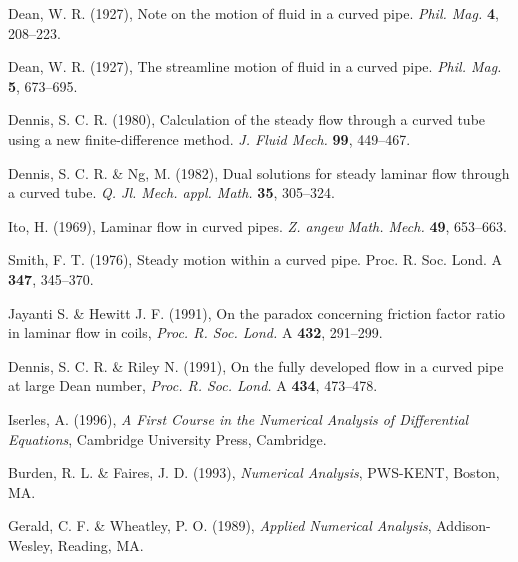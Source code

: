 \documentclass[10pt,a4paper]{report}
\begin{document}
\begin{thebibliography}{99}

Dean, W. R. (1927), Note on the motion of fluid in a curved pipe. \textit{Phil. Mag.} \textbf{4}, 208--223.

Dean, W. R. (1927), The streamline motion of fluid in a curved pipe. \textit{Phil. Mag.} \textbf{5}, 673--695.

Dennis, S. C. R. (1980), Calculation of the steady flow through a curved tube using a new finite-difference method. \textit{J. Fluid Mech.} \textbf{99}, 449--467.

Dennis, S. C. R. \& Ng, M. (1982), Dual solutions for steady laminar flow through a curved tube. \textit{Q. Jl. Mech. appl. Math.} \textbf{35}, 305--324.

Ito, H. (1969), Laminar flow in curved pipes. \textit{Z. angew Math. Mech.} \textbf{49}, 653--663.

Smith, F. T. (1976), Steady motion within a curved pipe. \textrm{Proc. R. Soc. Lond.} A \textbf{347}, 345--370.

 Jayanti S. \& Hewitt J. F. (1991), On the paradox concerning friction factor ratio in laminar flow in coils, \textit{Proc. R. Soc. Lond.} A \textbf{432}, 291--299.

Dennis, S. C. R. \& Riley N. (1991), On the fully developed flow in a curved pipe at large Dean number, \textit{Proc. R. Soc. Lond.} A \textbf{434}, 473--478.

Iserles, A. (1996), \textit{A First Course in the Numerical Analysis of Differential Equations}, Cambridge University Press, Cambridge.

Burden, R. L. \& Faires, J. D. (1993), \textit{Numerical Analysis}, PWS-KENT, Boston, MA.

Gerald, C. F. \& Wheatley, P. O. (1989), \textit{Applied Numerical Analysis}, Addison-Wesley, Reading, MA.

\end{thebibliography}
\end{document}
